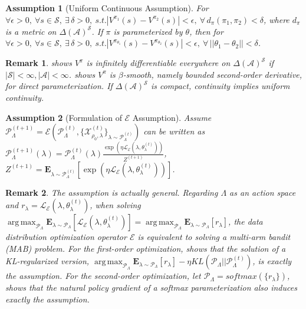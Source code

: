 \documentclass[nohyperref]{article}
\DeclareMathOperator*{\argmax}{arg\,max}
\theoremstyle{plain}
\newtheorem*{Remark}{\textbf{Remark}}
\newtheorem{Assumption}{\textbf{Assumption}}
\begin{document}
\begin{Assumption}[Uniform Continuous Assumption]
    For $\forall \epsilon > 0,\  \forall s \in \mathcal{S},\ \exists\, \delta > 0,\ s.t. |V^{\pi_1} (s) - V^{\pi_2} (s)| < \epsilon,\ \forall\, d_{\pi} (\pi_1, \pi_2) < \delta$,
    where $d_\pi$ is a metric on ${\Delta(\mathcal{A})}^\mathcal{S}$.
    If $\pi$ is parameterized by $\theta$, then for $\forall \epsilon > 0,\  \forall s \in \mathcal{S},\ \exists\, \delta > 0,\ s.t. |V^{\pi_{\theta_1}} (s) - V^{\pi_{\theta_2}} (s)| < \epsilon,\ \forall\, || \theta_1 - \theta_2 || < \delta$.
\label{asp:1}
\end{Assumption}
\begin{Remark}
    \citep{polytope} shows $V^\pi$ is infinitely differentiable everywhere on $\Delta (\mathcal{A})^{\mathcal{S}}$ if $|\mathcal{S}| < \infty, |\mathcal{A}| < \infty$.
    \citep{pgtheory} shows $V^\pi$ is $\beta$-smooth, namely bounded second-order derivative, for direct parameterization.
    If $\Delta (\mathcal{A})^{\mathcal{S}}$ is compact, continuity implies uniform continuity.
\end{Remark}

\begin{Assumption}[Formulation of $\mathcal{E}$ Assumption]
    Assume
    $\mathcal{P}_{\Lambda}^{(t+1)} 
    = \mathcal{E}(\mathcal{P}_{\Lambda}^{(t)}, \{\mathcal{X}^{(t)}_{\rho_0, \lambda}\}_{\lambda \sim \mathcal{P}^{(t)}_{\Lambda}}) $
    can be written as 
    $\mathcal{P}_{\Lambda}^{(t+1)} (\lambda)= \mathcal{P}_{\Lambda}^{(t)}(\lambda) \frac{\exp (\eta \mathcal{L}_{\mathcal{E}} (\lambda, \theta_{\lambda}^{(t)})  )}{Z^{(t+1)}}$, 
    $Z^{(t+1)} = \textbf{E}_{\lambda \sim \mathcal{P}_{\Lambda}^{(t)}}[\exp (\eta \mathcal{L}_{\mathcal{E}} (\lambda, \theta_{\lambda}^{(t)})  )]$.
\label{asp:2}
\end{Assumption}
\begin{Remark}
    The assumption is actually general.
    Regarding $\Lambda$ as an action space and 
    $r_\lambda 
    = \mathcal{L}_{\mathcal{E}} (\lambda, \theta_{\lambda}^{(t)})$, when solving $\argmax_{\mathcal{P}_{\Lambda}} \textbf{E}_{\lambda \sim \mathcal{P}_{\Lambda}} [\mathcal{L}_{\mathcal{E}} (\lambda, \theta_{\lambda}^{(t)})] 
    = \argmax_{\mathcal{P}_{\Lambda}} \textbf{E}_{\lambda \sim \mathcal{P}_{\Lambda}} [r_\lambda]$, the data distribution optimization operator $\mathcal{E}$ is equivalent to solving a multi-arm bandit (MAB) problem.
    For the first-order optimization, \citep{eq_pg_q} shows that the solution of a KL-regularized version, $\argmax_{\mathcal{P}_{\Lambda}} \textbf{E}_{\lambda \sim \mathcal{P}_{\Lambda}} [r_\lambda] - \eta KL(\mathcal{P}_{\Lambda} || \mathcal{P}_{\Lambda}^{(t)})$, is exactly the assumption.
    For the second-order optimization, let $\mathcal{P}_{\Lambda} = softmax (\{r_\lambda\})$, \citep{pgtheory} shows that the natural policy gradient of a softmax parameterization also induces exactly the assumption.
\end{Remark}
\end{document}
